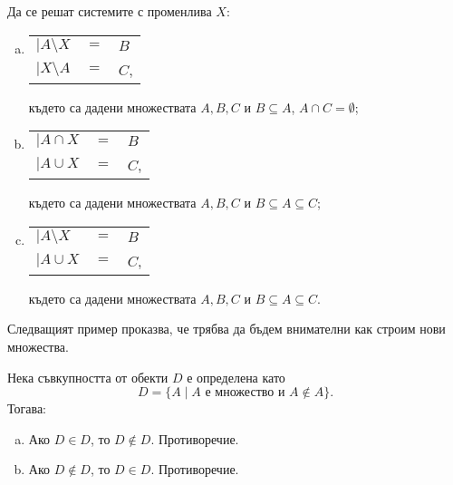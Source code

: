 \begin{problem}
  Да се решат системите с променлива $X$:
  \begin{enumerate}[a)]
  \item
    \begin{tabular}{l c l}
      $\big|A\setminus X$ & $= $ & $ B$\\
      $\big|X\setminus A $ & $=$ & $ C$,
    \end{tabular}
    
    където са дадени множествата $A,B,C$ и $B\subseteq A$, $A\cap C = \emptyset$;
  \item
    \begin{tabular}{l c l}
      $\big|A\cap X$ & $= $ & $ B$\\
      $\big|A\cup X $ & $=$ & $ C$,
    \end{tabular}
    
    където са дадени множествата $A,B,C$ и $B\subseteq A\subseteq C$;
  \item
    \begin{tabular}{l c l}
      $\big|A\setminus X$ & $= $ & $ B$\\
      $\big|A\cup X $ & $=$ & $ C$,
    \end{tabular}

    където са дадени множествата $A,B,C$ и $B\subseteq A\subseteq C$.

  \end{enumerate}
\end{problem}

Следващият пример проказва, че трябва да бъдем внимателни как строим нови множества.
\begin{example}
  Нека съвкупността от обекти $D$ е определена като
  \[D = \{A\mid A\mbox{ е множество и } A\not\in A\}.\]
  Тогава:
  \begin{enumerate}[a)]
  \item
    Ако $D \in D$, то $D \not\in D$. Противоречие.
  \item
    Ако $D \not\in D$, то $D \in D$. Противоречие.
  \end{enumerate}
\end{example}


